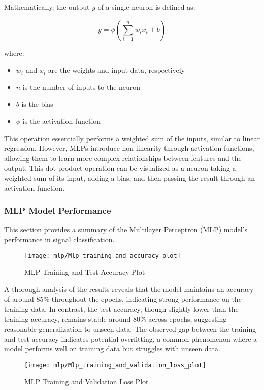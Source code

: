 Mathematically, the output \(y\) of a single neuron is defined as:

\[
y = \phi \left( \sum_{i=1}^{n} w_i x_i + b \right)
\]

where:
\begin{itemize}
  \item \(w_i\) and \(x_i\) are the weights and input data, respectively
  \item \(n\) is the number of inputs to the neuron
  \item \(b\) is the bias
  \item \(\phi\) is the activation function
\end{itemize}

This operation essentially performs a weighted sum of the inputs, similar to linear regression. However, MLPs introduce non-linearity through activation functions, allowing them to learn more complex relationships between features and the output. This dot product operation can be visualized as a neuron taking a weighted sum of its input, adding a bias, and then passing the result through an activation function.

\subsubsection{MLP Model Performance}

This section provides a summary of the Multilayer Perceptron (MLP) model's performance in signal classification.

\begin{figure}[H] 
	\centering
	\texttt{[image: mlp/Mlp\_training\_and\_accuracy\_plot]}
	\caption{MLP Training and Test Accuracy Plot}\label{fig:mlp_training_and_accuracy_plot}
\end{figure}

A thorough analysis of the results reveals that the model maintains an accuracy of around 85\% throughout the epochs, indicating strong performance on the training data. In contrast, the test accuracy, though slightly lower than the training accuracy, remains stable around 80\% across epochs, suggesting reasonable generalization to unseen data. The observed gap between the training and test accuracy indicates potential overfitting, a common phenomenon where a model performs well on training data but struggles with unseen data.

\begin{figure}[H] 
	\centering
	\texttt{[image: mlp/Mlp\_training\_and\_validation\_loss\_plot]}
	\caption{MLP Training and Validation Loss Plot}\label{fig:mlp_training_and_validation_loss_plot}
\end{figure}

